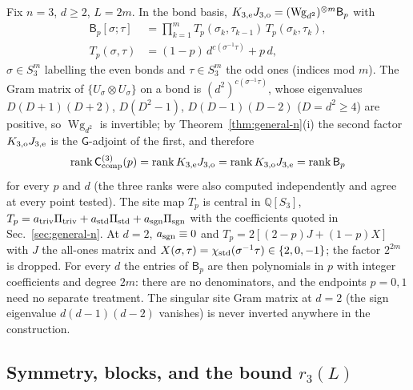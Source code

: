 \documentclass[aps,prx,reprint,superscriptaddress,nobibnotes,longbibliography]{revtex4-2}
\theoremstyle{remark}
\newcommand{\Wg}{\operatorname{Wg}}
\newcommand{\rk}{\operatorname{rank}}
\newcommand{\Ccomp}{\mathsf C_{\rm comp}}
\begin{document}
Fix $n=3$, $d\ge2$, $L=2m$.  In the bond basis, $K_{3,{\rm e}}J_{3,{\rm o}}=(\Wg_{d^2})^{\otimes m}\mathsf B_p$ with
\begin{align}
 \mathsf B_p[\sigma;\tau]&=\prod_{k=1}^{m}T_p(\sigma_k,\tau_{k-1})\,T_p(\sigma_k,\tau_k),\nonumber\\
 T_p(\sigma,\tau)&=(1-p)\,d^{c(\sigma^{-1}\tau)}+p\,d ,
 \label{eq:Bp3}
\end{align}
$\sigma\in S_3^{m}$ labelling the even bonds and $\tau\in S_3^{m}$ the odd ones (indices mod $m$).  The Gram matrix of $\{U_\sigma\otimes U_\sigma\}$ on a bond is $(d^2)^{c(\sigma^{-1}\tau)}$, whose eigenvalues $D(D+1)(D+2)$, $D(D^2-1)$, $D(D-1)(D-2)$ ($D=d^2\ge4$) are positive, so $\Wg_{d^2}$ is invertible; by Theorem~\ref{thm:general-n}(i) the second factor $K_{3,{\rm o}}J_{3,{\rm e}}$ is the $\mathsf G$-adjoint of the first, and therefore
\begin{equation}
 \rk\Ccomp^{(3)}(p)=\rk K_{3,{\rm e}}J_{3,{\rm o}}=\rk K_{3,{\rm o}}J_{3,{\rm e}}=\rk\mathsf B_p
 \label{eq:rankid}
\end{equation}
for every $p$ and $d$ (the three ranks were also computed independently and agree at every point tested).  The site map $T_p$ is central in $\mathbb Q[S_3]$, $T_p=a_{\rm triv}\Pi_{\rm triv}+a_{\rm std}\Pi_{\rm std}+a_{\rm sgn}\Pi_{\rm sgn}$ with the coefficients quoted in Sec.~\ref{sec:general-n}.  At $d=2$, $a_{\rm sgn}\equiv0$ and $T_p=2[(2-p)J+(1-p)X]$ with $J$ the all-ones matrix and $X(\sigma,\tau)=\chi_{\rm std}(\sigma^{-1}\tau)\in\{2,0,-1\}$; the factor $2^{2m}$ is dropped.  For every $d$ the entries of $\mathsf B_p$ are then polynomials in $p$ with integer coefficients and degree $2m$: there are no denominators, and the endpoints $p=0,1$ need no separate treatment.  The singular site Gram matrix at $d=2$ (the sign eigenvalue $d(d-1)(d-2)$ vanishes) is never inverted anywhere in the construction.

\subsection{Symmetry, blocks, and the bound $r_3(L)$}
\label{app:blocks}
\end{document}
